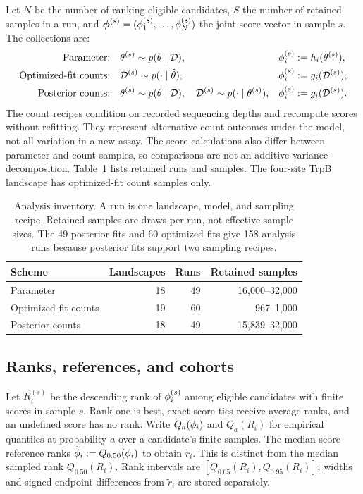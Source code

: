 Let $N$ be the number of ranking-eligible candidates, $S$ the
number of retained samples in a run, and
$\boldsymbol{\phi}^{(s)}=(\phi_1^{(s)},\ldots,\phi_N^{(s)})$
the joint score vector in sample $s$. The collections are:
\begin{align}
\text{Parameter:}\quad
&\theta^{(s)}\sim p(\theta\mid\mathcal{D}),
&&\phi_i^{(s)}:=h_i(\theta^{(s)}),\\
\text{Optimized-fit counts:}\quad
&\mathcal{D}^{(s)}\sim p(\cdot\mid\hat\theta),
&&\phi_i^{(s)}:=g_i(\mathcal{D}^{(s)}),\\
\text{Posterior counts:}\quad
&\theta^{(s)}\sim p(\theta\mid\mathcal{D}),\quad
\mathcal{D}^{(s)}\sim p(\cdot\mid\theta^{(s)}),
&&\phi_i^{(s)}:=g_i(\mathcal{D}^{(s)}).
\end{align}
The count recipes condition on recorded sequencing depths and
recompute scores without refitting. They represent alternative
count outcomes under the model, not all variation in a new assay.
The score calculations also differ between parameter and count
samples, so comparisons are not an additive variance decomposition.
Table~\ref{tab:inventory} lists retained runs and samples. The
four-site TrpB landscape has optimized-fit count samples only.

\begin{table}[htbp]
\centering
\caption{Analysis inventory. A run is one landscape, model, and sampling
recipe. Retained samples are draws per run, not effective sample sizes.
The 49 posterior fits and 60 optimized fits give 158 analysis runs
because posterior fits support two sampling recipes.}
\label{tab:inventory}
\begin{tabular}{lrrr}
\toprule
Scheme & Landscapes & Runs & Retained samples \\
\midrule
Parameter & 18 & 49 & 16,000--32,000 \\
Optimized-fit counts & 19 & 60 & 967--1,000 \\
Posterior counts & 18 & 49 & 15,839--32,000 \\
\bottomrule
\end{tabular}
\end{table}

\subsection{Ranks, references, and cohorts}

Let $R_i^{(s)}$ be the descending rank of $\phi_i^{(s)}$ among
eligible candidates with finite scores in sample $s$. Rank one
is best, exact score ties receive average ranks, and an undefined
score has no rank. Write $Q_a(\phi_i)$ and $Q_a(R_i)$ for empirical
quantiles at probability $a$ over a candidate's finite samples.
The median-score reference ranks $\widetilde{\phi}_i:=Q_{0.50}(\phi_i)$
to obtain $\widetilde r_i$. This is distinct from the median
sampled rank $Q_{0.50}(R_i)$. Rank intervals are
$[Q_{0.05}(R_i),Q_{0.95}(R_i)]$; widths and signed endpoint
differences from $\widetilde r_i$ are stored separately.

